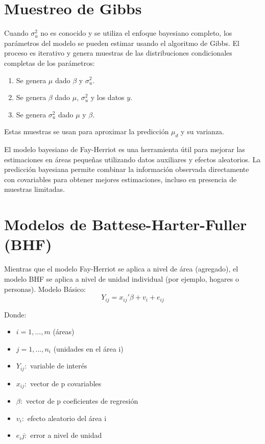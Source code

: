 \documentclass[12pt,spanish]{article}
\begin{document}
\section*{Muestreo de Gibbs}

Cuando \( \sigma^2_u \) no es conocido y se utiliza el enfoque bayesiano completo, los parámetros del modelo se pueden estimar usando el algoritmo de Gibbs. El proceso es iterativo y genera muestras de las distribuciones condicionales completas de los parámetros:

\begin{enumerate}
    \item Se genera \( \mu \) dado \( \beta \) y \( \sigma^2_u \).
    \item Se genera \( \beta \) dado \( \mu \), \( \sigma^2_u \) y los datos \( y \).
    \item Se genera \( \sigma^2_u \) dado \( \mu \) y \( \beta \).
\end{enumerate}

Estas muestras se usan para aproximar la predicción \( \mu_d \) y su varianza.

El modelo bayesiano de Fay-Herriot es una herramienta útil para mejorar las estimaciones en áreas pequeñas utilizando datos auxiliares y efectos aleatorios. La predicción bayesiana permite combinar la información observada directamente con covariables para obtener mejores estimaciones, incluso en presencia de muestras limitadas.

\section*{Modelos de Battese-Harter-Fuller (BHF) }

Mientras que el modelo Fay-Herriot se aplica a nivel de área (agregado), el modelo BHF se aplica a nivel de unidad individual (por ejemplo, hogares o personas).
Modelo Básico:
\[
Y_{ij} = x_{ij}' \beta + v_i + e_{ij}
\]

Donde:
\begin{itemize}
    \item $i = 1, ..., m$ (áreas)
    \item $j = 1, ..., n_i$ (unidades en el área i)
    \item $Y_{ij}:$ variable de interés
    \item $x_{ij}:$ vector de p covariables
    \item $\beta:$ vector de p coeficientes de regresión
    \item $v_i:$ efecto aleatorio del área i
    \item $e_ij:$ error a nivel de unidad
\end{itemize}
\end{document}
